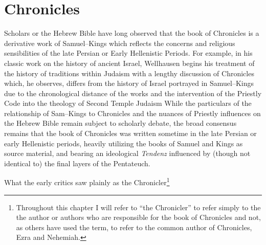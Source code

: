 \chapter{Chronicles}\label{chronicles}

Scholars or the Hebrew Bible have long observed that the book of
Chronicles is a derivative work of Samuel--Kings which reflects the
concerns and religious sensibilities of the late Persian or Early
Hellenistic Periods. For example, in his classic work on the history of
ancient Israel, Wellhausen begins his treatment of the history of
traditions within Judaism with a lengthy discussion of Chronicles which,
he observes, differs from the history of Israel portrayed in
Samuel--Kings due to the chronological distance of the works and the
intervention of the Priestly Code into the theology of Second Temple
Judaism\autocite[171--172]{wellhausen1957} While the particulars of the
relationship of Sam--Kings to Chronicles and the nuances of Priestly
influences on the Hebrew Bible remain subject to scholarly debate, the
broad consensus remains that the book of Chronicles was written sometime
in the late Persian or early Hellenistic periods, heavily utilizing the
books of Samuel and Kings as source material, and bearing an ideological
\emph{Tendenz} influenced by (though not identical to) the final layers
of the Pentateuch.\autocites[For a thorough and reasonably recent
summary of the \emph{status questionis}, see][72--89]{knoppers2003}[See
also][]{japhet1993}{japhet2009}{braun1986}[and][]{coggins1976}

What the early critics saw plainly as the Chronicler\footnote{Throughout
  this chapter I will refer to ``the Chronicler'' to refer simply to the
  the author or authors who are responsible for the book of Chronicles
  and not, as others have used the term, to refer to the common author
  of Chronicles, Ezra and Nehemiah.}
